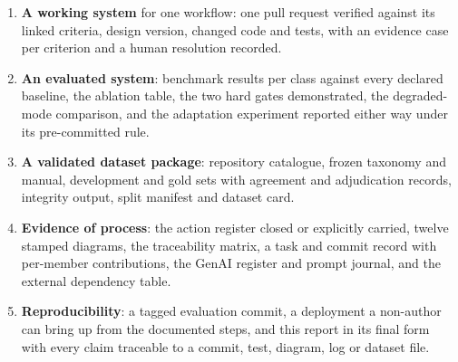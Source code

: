 \begin{enumerate}
  \item \textbf{A working system} for one workflow: one pull request verified
        against its linked criteria, design version, changed code and tests,
        with an evidence case per criterion and a human resolution recorded.
  \item \textbf{An evaluated system}: benchmark results per class against every
        declared baseline, the ablation table, the two hard gates demonstrated,
        the degraded-mode comparison, and the adaptation experiment reported
        either way under its pre-committed rule.
  \item \textbf{A validated dataset package}: repository catalogue, frozen
        taxonomy and manual, development and gold sets with agreement and
        adjudication records, integrity output, split manifest and dataset card.
  \item \textbf{Evidence of process}: the action register closed or explicitly
        carried, twelve stamped diagrams, the traceability matrix, a task and
        commit record with per-member contributions, the GenAI register and
        prompt journal, and the external dependency table.
  \item \textbf{Reproducibility}: a tagged evaluation commit, a deployment a
        non-author can bring up from the documented steps, and this report in
        its final form with every claim traceable to a commit, test, diagram,
        log or dataset file.
\end{enumerate}
